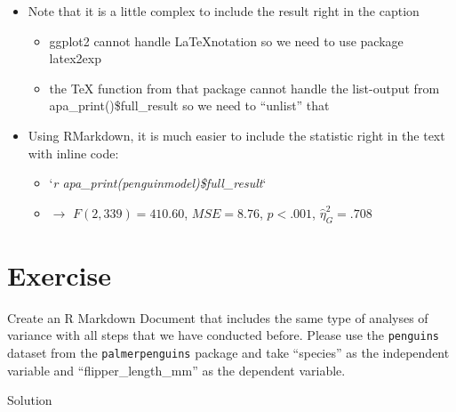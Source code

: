 \documentclass[
]{book}
\providecommand{\tightlist}{%
  \setlength{\itemsep}{0pt}\setlength{\parskip}{0pt}}
\begin{document}
\begin{itemize}
\tightlist
\item
  Note that it is a little complex to include the result right in the caption

  \begin{itemize}
  \tightlist
  \item
    ggplot2 cannot handle \LaTeX notation so we need to use package latex2exp
  \item
    the TeX function from that package cannot handle the list-output from apa\_print()\$full\_result so we need to ``unlist'' that
  \end{itemize}
\item
  Using RMarkdown, it is much easier to include the statistic right in the text with inline code:

  \begin{itemize}
  \tightlist
  \item
    `\emph{r apa\_print(penguinmodel)\$full\_result}`
  \item
    \(\rightarrow\) { \(F(2, 339) = 410.60\), \(\mathit{MSE} = 8.76\), \(p < .001\), \(\hat{\eta}^2_G = .708\) }
  \end{itemize}
\end{itemize}

\section*{Exercise}\label{exercise-8}

Create an R Markdown Document that includes the same type of analyses of variance with all steps that we have conducted before.
Please use the \texttt{penguins} dataset from the \texttt{palmerpenguins} package and take ``species'' as the independent variable and ``flipper\_length\_mm'' as the dependent variable.

Solution
\end{document}
